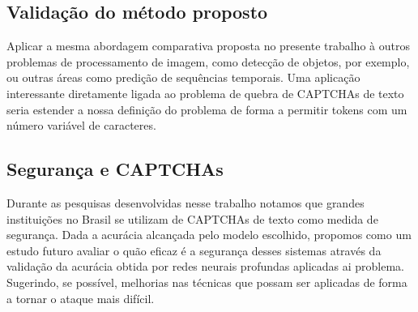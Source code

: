 \subsection*{Validação do método proposto}
Aplicar a mesma abordagem comparativa proposta no presente trabalho à outros problemas de processamento de imagem, como detecção de objetos, por exemplo, ou outras áreas como predição de sequências temporais. Uma aplicação interessante diretamente ligada ao problema de quebra de CAPTCHAs de texto seria estender a nossa definição do problema de forma a permitir tokens com um número variável de caracteres. 

\subsection*{Segurança e CAPTCHAs}
Durante as pesquisas desenvolvidas nesse trabalho notamos que grandes instituições no Brasil se utilizam de CAPTCHAs de texto como medida de segurança. Dada a acurácia alcançada pelo modelo escolhido, propomos como um estudo futuro avaliar o quão eficaz é a segurança desses sistemas através da validação da acurácia obtida por redes neurais profundas aplicadas ai problema. Sugerindo, se possível, melhorias nas técnicas que possam ser aplicadas de forma a tornar o ataque mais difícil.
